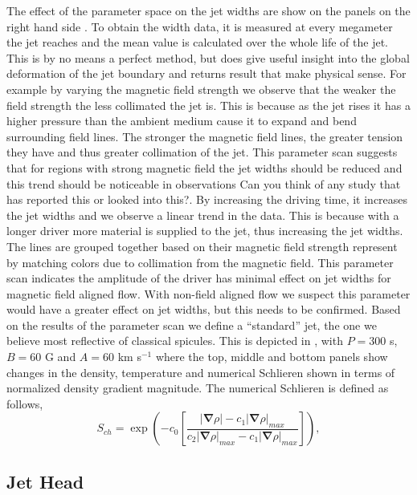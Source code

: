 The effect of the parameter space on the jet widths are show on the panels on the right hand side . To obtain the width data, it is measured at every megameter the jet reaches and the mean value is calculated over the whole life of the jet. This is by no means a perfect method, but does give useful insight into the global deformation of the jet boundary and returns result that make physical sense. For example by varying the magnetic field strength we observe that the weaker the field strength the less collimated the jet is. This is because as the jet rises it has a higher pressure than the ambient medium cause it to expand and bend surrounding field lines. The stronger the magnetic field lines, the greater tension they have and thus greater collimation of the jet. This parameter scan suggests that for regions with strong magnetic field the jet widths should be reduced and this trend should be noticeable in observations {\color{green} Can you think of any study that has reported this or looked into this?}. By increasing the driving time, it increases the jet widths and we observe a linear trend in the data. This is because with a longer driver more material is supplied to the jet, thus increasing the jet widths. The lines are grouped together based on their magnetic field strength represent by matching colors due to collimation from the magnetic field. This parameter scan indicates the amplitude of the driver has minimal effect on jet widths for magnetic field aligned flow. With non-field aligned flow we suspect this parameter would have a greater effect on jet widths, but this needs to be confirmed. \np
%
Based on the results of the parameter scan we define a ``standard'' jet, the one we believe most reflective of classical spicules. This is depicted in , with $P=300$ s, $B=60$ G and $A=60$ km s$^{-1}$ where the top, middle and bottom panels show changes in the density, temperature and numerical Schlieren shown in terms of normalized density gradient magnitude. The numerical Schlieren is defined as follows,
\begin{equation}
    S_{ch} = \exp{\left( -c_0 \left[ \frac{|\boldsymbol{\nabla} \rho|-c_1 |\boldsymbol{\nabla} \rho|_{max}}{c_2 |\boldsymbol{\nabla} \rho|_{max}-c_1|\boldsymbol{\nabla} \rho|_{max}} \right] \right)}, 
\end{equation}

\subsection{Jet Head}
\label{subsec:j_head}
